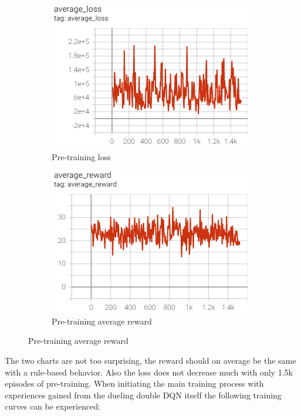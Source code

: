 \begin{figure}[ht]
	\centering
	\begin{subfigure}[b]{0.49\textwidth}
		\centering
		\includegraphics[width=\textwidth]{figures/training1-pre-loss.PNG}
		\caption{Pre-training loss}
		\label{fig:pre-loss-1}
	\end{subfigure}
	\hfill
	\begin{subfigure}[b]{0.49\textwidth}
		\centering
		\includegraphics[width=\textwidth]{figures/training1-pre-reward.PNG}
		\caption{Pre-training average reward}
		\label{fig:pre-reward-1}
	\end{subfigure}
\end{figure}

The two charts are not too surprising, the reward should on average be the same with a rule-based behavior. Also the loss does not decrease much with only 1.5k episodes of pre-training. When initiating the main training process with experiences gained from the dueling double DQN itself the following training curves can be experienced:

